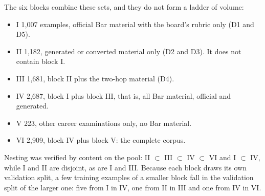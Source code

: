 \documentclass{IOS-Book-Article}
\begin{document}
The six blocks combine these sets, and they do not form a ladder of volume:
\begin{itemize}
\item I \textperiodcentered{} 1,007 examples, official Bar material with the board's rubric only (D1 and D5).
\item II \textperiodcentered{} 1,182, generated or converted material only (D2 and D3). It does not contain block I.
\item III \textperiodcentered{} 1,681, block II plus the two-hop material (D4).
\item IV \textperiodcentered{} 2,687, block I plus block III, that is, all Bar material, official and generated.
\item V \textperiodcentered{} 223, other career examinations only, no Bar material.
\item VI \textperiodcentered{} 2,909, block IV plus block V: the complete corpus.
\end{itemize}
Nesting was verified by content on the pool: II $\subset$ III $\subset$ IV $\subset$ VI and I $\subset$ IV, while I and II are disjoint, as are I and III. Because each block draws its own validation split, a few training examples of a smaller block fall in the validation split of the larger one: five from I in IV, one from II in III and one from IV in VI.
\end{document}
